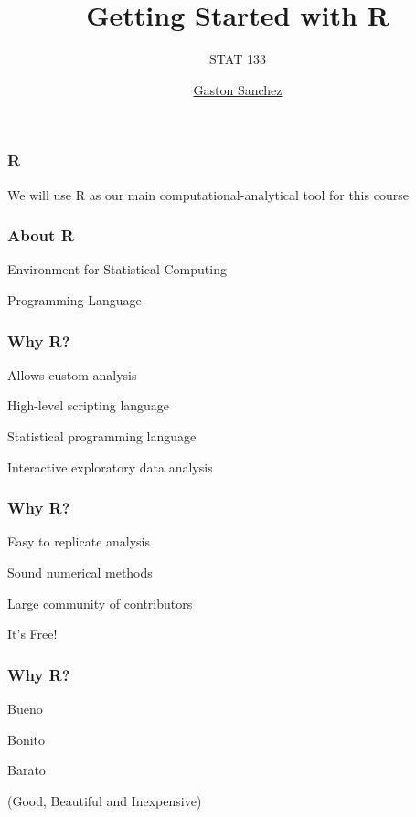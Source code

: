 \documentclass[12pt]{beamer}\usepackage[]{graphicx}\usepackage[]{color}
\title{Getting Started with R}
\subtitle{STAT 133}
\author{\href{http://www.gastonsanchez.com}{Gaston Sanchez}}
\institute{\href{https://github.com/ucb-stat133/stat133-fall-2016}{\tt \scriptsize \color{foreground} github.com/ucb-stat133/stat133-fall-2016}}
\date{}
\begin{document}
{
  \frame{
    \titlepage
  } 
}


\begin{frame}
\frametitle{R}

\Large We will use R as our main computational-analytical tool for this course

\end{frame}


\begin{frame}
\frametitle{About R}

\bbi
  \item Environment for Statistical Computing
  \item Programming Language
\ei
\eb

\end{frame}


\begin{frame}
\frametitle{Why R?}

\bbi
  \item Allows custom analysis
  \item High-level scripting language
  \item Statistical programming language
  \item Interactive exploratory data analysis
\ei

\end{frame}


\begin{frame}
\frametitle{Why R?}

\bbi
  \item Easy to replicate analysis
  \item Sound numerical methods
  \item Large community of contributors
  \item It's Free!
\ei

\end{frame}


\begin{frame}
\frametitle{Why R?}

\bbi
  \item Bueno
  \item Bonito
  \item Barato
\ei

\bigskip
(Good, Beautiful and Inexpensive)
\eb

\end{frame}
\end{document}

